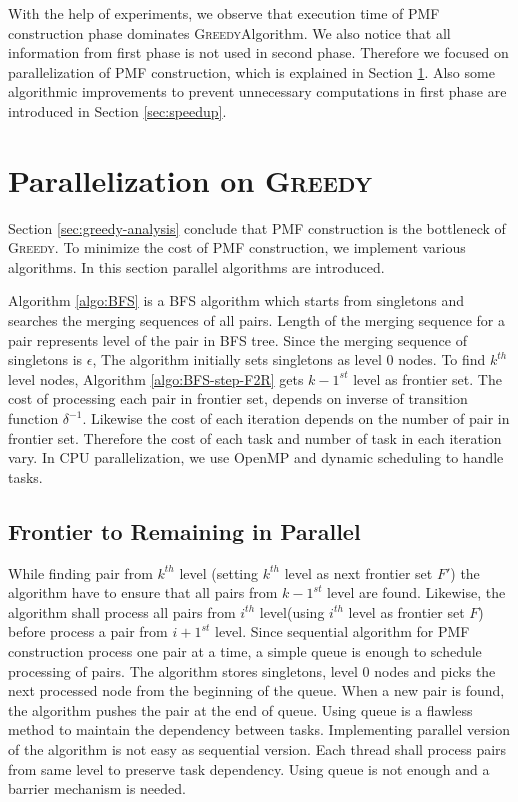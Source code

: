 \documentclass[12pt]{article}
\newcommand{\comment}[2]{{\color{red}{\bf (#1: #2)}}}
\newcommand{\greedyAlgo}{\textsc{Greedy}}
\begin{document}
With the help of experiments, we observe that execution time of PMF construction phase dominates \greedyAlgo \space Algorithm. We also notice that all information from first phase is not used in second phase. Therefore we focused on parallelization of PMF construction, which is explained in Section \ref{sec:parallel}. Also some algorithmic improvements to prevent unnecessary computations in first phase are introduced in Section \ref{sec:speedup}.


\clearpage
\section{Parallelization on \greedyAlgo}
\label{sec:parallel}

Section \ref{sec:greedy-analysis} conclude that PMF construction is the bottleneck of \greedyAlgo . To minimize the cost of PMF construction, we implement various algorithms. In this section parallel algorithms are introduced.

Algorithm \ref{algo:BFS} is a BFS algorithm which starts from singletons and searches the merging sequences of all pairs. Length of the merging sequence for a pair represents level of the pair in BFS tree. Since the merging sequence of singletons is $\epsilon$, The algorithm initially sets singletons as level 0 nodes. To find $k^{th}$ level nodes, Algorithm \ref{algo:BFS-step-F2R} gets $k-1^{st}$ level as frontier set. The cost of processing each pair in frontier set, depends on inverse of transition function $\delta^{-1}$. Likewise the cost of each iteration depends on the number of pair in frontier set. Therefore the cost of each task and number of task in each iteration vary. In CPU parallelization, we use OpenMP and dynamic scheduling to handle tasks. 

\comment{sertac}{BFS icin ornek figure cizilebilir}

\subsection{Frontier to Remaining in Parallel}
\label{sec:BFS-F2R-parallel}

While finding pair from $k^{th}$ level (setting $k^{th}$ level as next frontier set $F'$) the algorithm have to ensure that all pairs from $k-1^{st}$ level are found. Likewise, the algorithm shall process all pairs from $i^{th}$ level(using $i^{th}$ level as frontier set $F$) before process a pair from $i+1^{st}$ level. Since sequential algorithm for PMF construction process one pair at a time, a simple queue is enough to schedule processing of pairs. The algorithm stores singletons, level 0 nodes and picks the next processed node from the beginning of the queue. When a new pair is found, the algorithm pushes the pair at the end of queue. Using queue is a flawless method to maintain the dependency between tasks. Implementing parallel version of the algorithm is not easy as sequential version. Each thread shall process pairs from same level to preserve task dependency. Using queue is not enough and a barrier mechanism is needed.
\end{document}
